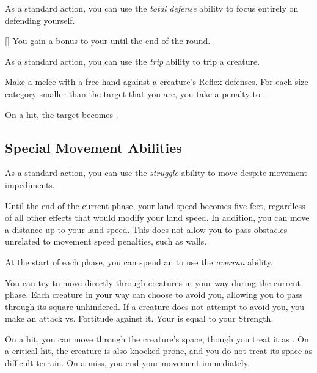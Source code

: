         As a standard action, you can use the \textit{total defense} ability to focus entirely on defending yourself.

        \begin{freeability}{}[]
            You gain a  bonus to your  until the end of the round.
        \end{freeability}

         As a standard action, you can use the \textit{trip} ability to trip a creature.

        \begin{freeability}{}
            Make a melee  with a free hand against a creature's Reflex defenses.
            For each size category smaller than the target that you are, you take a  penalty to .

            On a hit, the target becomes \prone.
        \end{freeability}

    \subsection{Special Movement Abilities}

         As a standard action, you can use the \textit{struggle} ability to move despite movement impediments.

        \begin{freeability}{}
            Until the end of the current phase, your land speed becomes five feet, regardless of all other effects that would modify your land speed.
            In addition, you can move a distance up to your land speed.
            This does not allow you to pass obstacles unrelated to movement speed penalties, such as walls.
        \end{freeability}

         At the start of each phase, you can spend an  to use the \textit{overrun} ability.

        \begin{freeability}{}
            You can try to move directly through creatures in your way during the current phase.
            Each creature in your way can choose to avoid you, allowing you to pass through its square unhindered.
            If a creature does not attempt to avoid you, you make an attack vs. Fortitude against it.
            Your  is equal to your Strength.

            On a hit, you can move through the creature's space, though you treat it as .
            On a critical hit, the creature is also knocked prone, and you do not treat its space as difficult terrain.
            On a miss, you end your movement immediately.
        \end{freeability}

